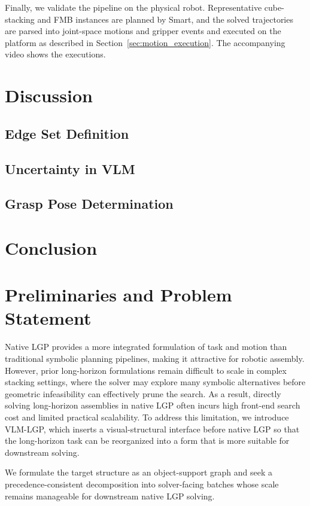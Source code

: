 \documentclass[journal]{IEEEtran}
\begin{document}
Finally, we validate the pipeline on the physical robot. Representative
cube-stacking and FMB instances are planned by Smart, and the solved
trajectories are parsed into joint-space motions and gripper events and
executed on the platform as described in
Section~\ref{sec:motion_execution}. The accompanying video shows the
executions.

\section{Discussion}
\subsection{Edge Set Definition}
\subsection{Uncertainty in VLM}
\subsection{Grasp Pose Determination}

\section{Conclusion}

\newpage 

\section{Preliminaries and Problem Statement}\label{sec:preliminaries}
Native LGP provides a more integrated formulation of task and motion than traditional symbolic planning pipelines, making it attractive for robotic assembly.
However, prior long-horizon formulations remain difficult to scale in complex stacking settings, where the solver may explore many symbolic alternatives before geometric infeasibility can effectively prune the search. As a result, directly solving long-horizon assemblies in native LGP often incurs high front-end search cost and limited practical scalability. To address this limitation, we introduce VLM-LGP, which inserts a visual-structural interface before native LGP so that the long-horizon task can be reorganized into a form that is more suitable for downstream solving.

We formulate the target structure as an object-support graph and seek a precedence-consistent decomposition into solver-facing batches whose scale remains manageable for downstream native LGP solving.
\end{document}
